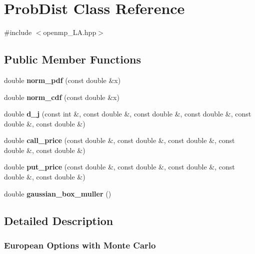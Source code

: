 \hypertarget{classProbDist}{}\section{Prob\+Dist Class Reference}
\label{classProbDist}


{\ttfamily \#include $<$openmp\+\_\+\+L\+A.\+hpp$>$}

\subsection*{Public Member Functions}
\begin{DoxyCompactItemize}
\item 
\mbox{\label{classProbDist_a13d09e11095574b1ad9f13fc2c465ba3}} 
double {\bfseries norm\+\_\+pdf} (const double \&x)
\item 
\mbox{\label{classProbDist_a36682e031a24ad12a12fc862d7255907}} 
double {\bfseries norm\+\_\+cdf} (const double \&x)
\item 
\mbox{\label{classProbDist_ace4aaaa131e238b5580b0c0997c1eb91}} 
double {\bfseries d\+\_\+j} (const int \&, const double \&, const double \&, const double \&, const double \&, const double \&)
\item 
\mbox{\label{classProbDist_a429dbe8c4d259e8432af9e277f04f824}} 
double {\bfseries call\+\_\+price} (const double \&, const double \&, const double \&, const double \&, const double \&)
\item 
\mbox{\label{classProbDist_aff1e433c9e4bc7b14c44dd06f070ee80}} 
double {\bfseries put\+\_\+price} (const double \&, const double \&, const double \&, const double \&, const double \&)
\item 
\mbox{\label{classProbDist_a6eafe4dfea02121acc319364c4a9ee4e}} 
double {\bfseries gaussian\+\_\+box\+\_\+muller} ()
\end{DoxyCompactItemize}


\subsection{Detailed Description}
\subsubsection*{European Options with Monte Carlo }

